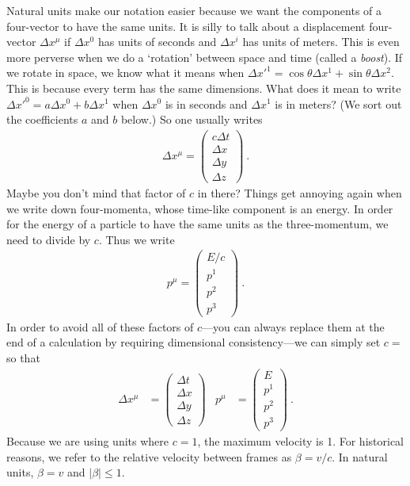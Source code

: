 \documentclass[12pt, oneside]{report}    %
\begin{document}
Natural units make our notation easier because we want the components of a four-vector to have the same units. It is silly to talk about a displacement four-vector $\Delta x^\mu$ if $\Delta x^0$ has units of seconds and $\Delta x^i$ has units of meters. This is even more perverse when we do a `rotation' between space and time (called a \emph{boost}). If we rotate in space, we know what it means when $\Delta x'^1 = \cos\theta \Delta x^1 + \sin\theta \Delta x^2$. This is because every term has the same dimensions. What does it mean to write $\Delta x'^0 = a \Delta x^0 + b \Delta x^1$ when $\Delta x^0$ is in seconds and $\Delta x^1$ is in meters? (We sort out the coefficients $a$ and $b$ below.) So one usually writes 
\begin{align}
    \Delta x^\mu = 
    \begin{pmatrix}
        c\Delta t \\ \Delta x \\ \Delta y \\ \Delta z
    \end{pmatrix} \ .
\end{align}
Maybe you don't mind that factor of $c$ in there? Things get annoying again when we write down four-momenta, whose time-like component is an energy. In order for the energy of a particle to have the same units as the three-momentum, we need to divide by $c$. Thus we write
\begin{align}
    p^\mu = 
    \begin{pmatrix}
        E/c \\
        p^1\\
        p^2\\
        p^3
    \end{pmatrix} \ .
\end{align}
In order to avoid all of these factors of $c$---you can always replace them at the end of a calculation by requiring dimensional consistency---we can simply set $c=$ so that
\begin{align}
    \Delta x^\mu &= 
    \begin{pmatrix}
        \Delta t \\ \Delta x \\ \Delta y \\ \Delta z
    \end{pmatrix}
    &
    p^\mu &= 
    \begin{pmatrix}
        E \\
        p^1\\
        p^2\\
        p^3
    \end{pmatrix} \ .
    \label{eq:momentum:4vec}
\end{align}
Because we are using units where $c=1$, the maximum velocity is 1. For historical reasons, we refer to the relative velocity between frames as $\beta = v/c$. In natural units, $\beta = v$ and $|\beta| \leq 1$.  
\end{document}
